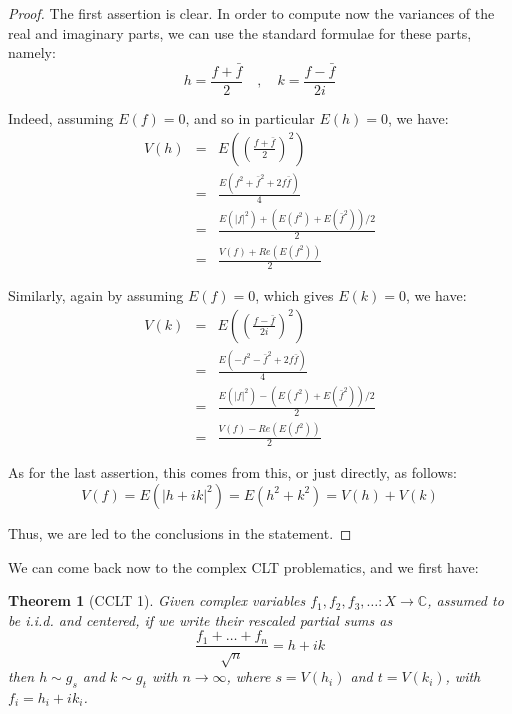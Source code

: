 \documentclass[12pt]{amsbook}
\newtheorem{theorem}{Theorem}[chapter]
\begin{document}
\begin{proof}
The first assertion is clear. In order to compute now the variances of the real and imaginary parts, we can use the standard formulae for these parts, namely:
$$h=\frac{f+\bar{f}}{2}\quad,\quad k=\frac{f-\bar{f}}{2i}$$

Indeed, assuming $E(f)=0$, and so in particular $E(h)=0$, we have:
\begin{eqnarray*}
V(h)
&=&E\left(\left(\frac{f+\bar{f}}{2}\right)^2\right)\\
&=&\frac{E(f^2+\bar{f}^2+2f\bar{f})}{4}\\
&=&\frac{E(|f|^2)+(E(f^2)+E(\bar{f}^2))/2}{2}\\
&=&\frac{V(f)+Re(E(f^2))}{2}
\end{eqnarray*}

Similarly, again by assuming $E(f)=0$, which gives $E(k)=0$, we have:
\begin{eqnarray*}
V(k)
&=&E\left(\left(\frac{f-\bar{f}}{2i}\right)^2\right)\\
&=&\frac{E(-f^2-\bar{f}^2+2f\bar{f})}{4}\\
&=&\frac{E(|f|^2)-(E(f^2)+E(\bar{f}^2))/2}{2}\\
&=&\frac{V(f)-Re(E(f^2))}{2}
\end{eqnarray*}

As for the last assertion, this comes from this, or just directly, as follows:
$$V(f)=E(|h+ik|^2)=E(h^2+k^2)=V(h)+V(k)$$

Thus, we are led to the conclusions in the statement.
\end{proof}

We can come back now to the complex CLT problematics, and we first have:


\begin{theorem}[CCLT 1]
Given complex variables $f_1,f_2,f_3,\ldots:X\to\mathbb C$, assumed to be i.i.d. and centered, if we write their rescaled partial sums as
$$\frac{f_1+\ldots+f_n}{\sqrt{n}}=h+ik$$
then $h\sim g_s$ and $k\sim g_t$ with $n\to\infty$, where $s=V(h_i)$ and $t=V(k_i)$, with $f_i=h_i+ik_i$. 
\end{theorem}
\end{document}
